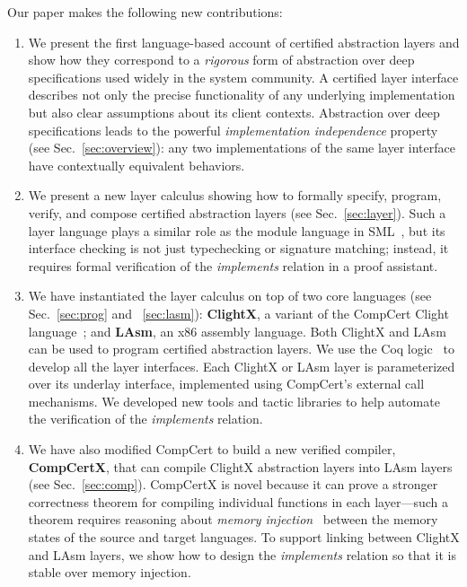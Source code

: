 {Our paper makes the following new contributions:
\begin{enumerate}
\item We present the first language-based account of certified
  abstraction layers and show how they correspond to a {\em rigorous} 
  form of abstraction over deep specifications used widely
  in the system community. A certified layer interface
  describes not only the precise functionality of any underlying
  implementation but also clear assumptions about its client contexts.
  Abstraction over deep specifications leads to the powerful
  {\em implementation independence} property
  (see Sec.~\ref{sec:overview}): 
  any two implementations
  of the same layer interface have contextually equivalent behaviors.
\item We present a new layer calculus showing how to formally specify,
  program, verify, and compose certified abstraction layers 
  (see Sec.~\ref{sec:layer}). Such a
  layer language plays a similar role as the module language in
  SML~\cite{milner97}, but its interface checking is not just
  typechecking or signature matching; instead, it requires formal
  verification of the {\em implements} relation in a proof assistant.
\item We have instantiated the layer calculus on top of two core
  languages (see Sec.~\ref{sec:prog} and ~\ref{sec:lasm}): {\bf
    ClightX}, a variant of the CompCert Clight
  language~\cite{blazy-leroy-clight}; and {\bf LAsm}, an x86 assembly
  language.  Both ClightX and LAsm can be used to program certified
  abstraction layers.  We use the Coq logic~\cite{coq} to develop all
  the layer interfaces.  Each ClightX or LAsm layer is parameterized
  over its underlay interface, implemented using CompCert's external
  call mechanisms.  We developed new tools and tactic libraries to
  help automate the verification of the {\em implements} relation.
\item We have also modified CompCert to build a new verified compiler,
  {\bf CompCertX}, that can compile ClightX abstraction layers into
  LAsm layers (see Sec.~\ref{sec:comp}). 
  CompCertX is novel because it can prove a stronger
  correctness theorem for compiling individual functions in each
  layer---such a theorem requires reasoning about {\em memory
    injection}~\cite{leroy08} between the memory states of the source
  and target languages.  To support linking between ClightX and LAsm
  layers, we show how to design the {\em implements} relation so that it
  is stable over memory injection.

\end{enumerate}}
